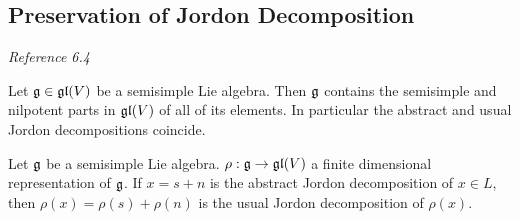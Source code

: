 \subsection{Preservation of Jordon Decomposition}
\label{sub:preservation_of_jordon_decomposition}
\emph{Reference \cite{humphreys1972introduction} 6.4}

\begin{theorem}
    \label{thm:preservation_of_jordon_decomposition}
   Let $\mathfrak{g}\in \mathfrak{gl}(V)$  be a semisimple Lie algebra. Then $\mathfrak{g}$ contains the semisimple and nilpotent parts in $\mathfrak{gl}(V)$ of all of its elements. In  particular the abstract and usual Jordon decompositions coincide.
\end{theorem}

\begin{corollary}
    \label{cor:jordon}
    Let $\mathfrak{g}$ be a semisimple Lie algebra. $\rho: \mathfrak{g}\to \mathfrak{gl}(V)$ a finite dimensional representation of $\mathfrak{g}$. If $x=s + n$ is the abstract Jordon decomposition of $x\in L$, then $\rho(x)=\rho(s) + \rho(n)$ is the usual Jordon decomposition of $\rho(x)$.
\end{corollary}


